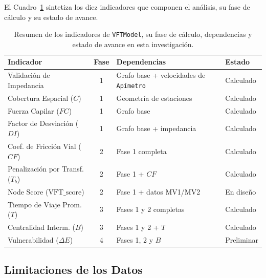El Cuadro~\ref{tab:resumen-indicadores-cap5} sintetiza los diez indicadores que
componen el análisis, su fase de cálculo y su estado de avance.

\begin{table}[H]
    \centering
    \caption[Indicadores de \texttt{VFTModel} por fase de cálculo]{Resumen de los
    indicadores de \texttt{VFTModel}, su fase de cálculo, dependencias y
    estado de avance en esta investigación.}
    \label{tab:resumen-indicadores-cap5}
    \begin{tabularx}{\textwidth}{|l|c|X|l|}
        \hline
        \textbf{Indicador} & \textbf{Fase} & \textbf{Dependencias} &
        \textbf{Estado} \\
        \hline
        Validación de Impedancia      & 1 & Grafo base + velocidades de \texttt{Apímetro} & Calculado \\
        Cobertura Espacial ($C$)      & 1 & Geometría de estaciones      & Calculado \\
        Fuerza Capilar ($FC$)         & 1 & Grafo base                   & Calculado \\
        Factor de Desviación ($DI$)   & 1 & Grafo base + impedancia      & Calculado \\
        \hline
        Coef. de Fricción Vial ($CF$)     & 2 & Fase 1 completa          & Calculado \\
        Penalización por Transf. ($T_b$)  & 2 & Fase 1 + $CF$            & Calculado \\
        Node Score ($\text{VFT\_score}$)  & 2 & Fase 1 + datos MV1/MV2   & En diseño \\
        \hline
        Tiempo de Viaje Prom. ($T$)   & 3 & Fases 1 y 2 completas        & Calculado \\
        Centralidad Interm. ($B$)     & 3 & Fases 1 y 2 + $T$            & Calculado \\
        \hline
        Vulnerabilidad ($\Delta E$)   & 4 & Fases 1, 2 y $B$             & Preliminar \\
        \hline
    \end{tabularx}
\end{table}

\subsection{Limitaciones de los Datos}
\label{subsec:limitaciones-datos}

